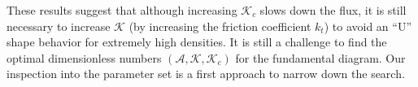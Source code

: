 \documentclass[preprint,12pt]{elsarticle}
\begin{document}

These results suggest that although increasing $\mathcal{K}_c$ slows down the flux, it is still necessary to increase $\mathcal{K}$ (by increasing the friction coefficient $k_t$) to avoid an ``U'' shape behavior for extremely high densities. It is still a challenge to find the optimal dimensionless numbers  $(\mathcal{A},\mathcal{K},\mathcal{K}_c)$ for the fundamental diagram. Our inspection into the parameter set is a first approach to narrow down the search.\\

\end{document}
